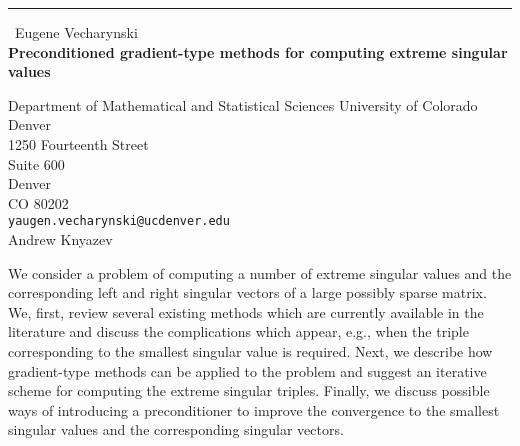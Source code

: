 \documentclass{report}
\begin{document}
\begin{center}
\rule{6in}{1pt} \
{\large Eugene Vecharynski \\
{\bf Preconditioned gradient-type methods for computing extreme singular values}}

Department of Mathematical and Statistical Sciences University of Colorado Denver \\ 1250 Fourteenth Street \\ Suite 600 \\ Denver \\ CO 80202
\\
{\tt yaugen.vecharynski@ucdenver.edu}\\
Andrew Knyazev\end{center}

We consider a problem of computing a number of extreme singular values
and the corresponding left and right singular vectors of
a large possibly sparse matrix. We, first, review several existing
methods which are currently available in the literature
and discuss the complications which appear, e.g., when the triple
corresponding to the smallest singular value is required. Next, we
describe how gradient-type methods can be applied to the problem and
suggest an iterative scheme for computing the extreme singular triples.
Finally, we discuss possible ways of introducing a preconditioner to
improve the convergence to the smallest singular values and the
corresponding singular vectors.
\end{document}
